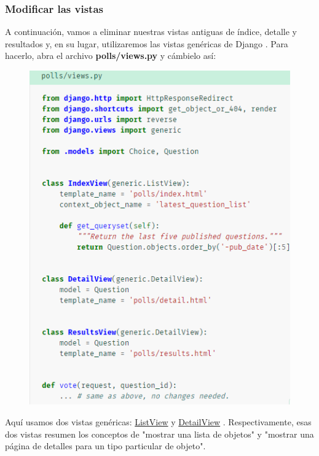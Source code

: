 \documentclass[10pt]{article}
\newcommand{\django}[1]{{\textcolor{G}{Django} #1}}
\begin{document}
\subsubsection*{Modificar las vistas}
A continuación, vamos a eliminar nuestras vistas antiguas de índice, detalle y resultados y, en su lugar, utilizaremos las vistas genéricas de \django{}. Para hacerlo, abra el archivo \textbf{polls/views.py} y cámbielo así:
\begin{figure}[H]
\begin{center}
\includegraphics[scale=0.85]{figuras/3/34/342/img2.png}
\end{center}
\end{figure}

Aquí usamos dos vistas genéricas: {\href{https://docs.djangoproject.com/en/3.0/ref/class-based-views/generic-display/\#django.views.generic.list.ListView}{\textcolor{B}{ListView}}}
y
{\href{https://docs.djangoproject.com/en/3.0/ref/class-based-views/generic-display/\#django.views.generic.detail.DetailView}{\textcolor{B}{DetailView}}}
. Respectivamente, esas dos vistas resumen los conceptos de "mostrar una lista de objetos" y "mostrar una página de detalles para un tipo particular de objeto".
\end{document}
